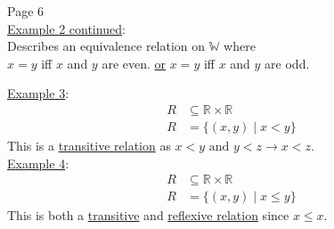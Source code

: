 \documentclass{article}
\begin{document}
\newpage
\begin{flushleft}
    Page 6 \\
    \vspace{1em}
    \underline{Example 2 continued}: \\
    \vspace{0.5em}
    Describes an equivalence relation on $\mathbb{W}$ where \\
    \vspace{0.5em}
    $x=y$ iff $x$ and $y$ are even. \quad \underline{or} \quad $x=y$ iff $x$ and $y$ are odd.
    \end{flushleft}
    \begin{center}
    \end{center}
\begin{flushleft}
\underline{Example 3}: \begin{align*}
    R &\subseteq \mathbb{R} \times \mathbb{R}  \\
    R &= \{ (x,y) \mid x < y \}
    \end{align*}
This is a \underline{transitive relation} as $x < y \text{ and } y < z \rightarrow x < z$. \\
\vspace{2em}
\underline{Example 4}: \begin{align*}
    R &\subseteq \mathbb{R} \times \mathbb{R}  \\
    R &= \{ (x,y) \mid x \leq y \}
    \end{align*}
This is both a \underline{transitive} and \underline{ reflexive relation} since $x \leq x$. \\
\end{flushleft}
\end{document}
